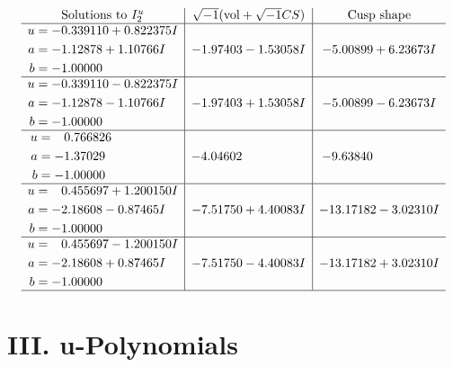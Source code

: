 \documentclass[1p]{elsarticle_modified}
\theoremstyle{definition}
\newcommand{\I}{\sqrt{-1}}
\begin{document}
$$\begin{array}{c|c|c}  
\text{Solutions to }I^u_{2}& \I (\text{vol} + \sqrt{-1}CS) & \text{Cusp shape}\\
 \hline 
\begin{aligned}
u &= -0.339110 + 0.822375 I \\
a &= -1.12878 + 1.10766 I \\
b &= -1.00000\phantom{ +0.000000I}\end{aligned}
 & -1.97403 - 1.53058 I & -5.00899 + 6.23673 I \\ \hline\begin{aligned}
u &= -0.339110 - 0.822375 I \\
a &= -1.12878 - 1.10766 I \\
b &= -1.00000\phantom{ +0.000000I}\end{aligned}
 & -1.97403 + 1.53058 I & -5.00899 - 6.23673 I \\ \hline\begin{aligned}
u &= \phantom{-}0.766826\phantom{ +0.000000I} \\
a &= -1.37029\phantom{ +0.000000I} \\
b &= -1.00000\phantom{ +0.000000I}\end{aligned}
 & -4.04602\phantom{ +0.000000I} & -9.63840\phantom{ +0.000000I} \\ \hline\begin{aligned}
u &= \phantom{-}0.455697 + 1.200150 I \\
a &= -2.18608 - 0.87465 I \\
b &= -1.00000\phantom{ +0.000000I}\end{aligned}
 & -7.51750 + 4.40083 I & -13.17182 - 3.02310 I \\ \hline\begin{aligned}
u &= \phantom{-}0.455697 - 1.200150 I \\
a &= -2.18608 + 0.87465 I \\
b &= -1.00000\phantom{ +0.000000I}\end{aligned}
 & -7.51750 - 4.40083 I & -13.17182 + 3.02310 I\\
 \hline 
 \end{array}$$\newpage
\newpage\renewcommand{\arraystretch}{1}
\centering \section*{ III. u-Polynomials}
\end{document}
